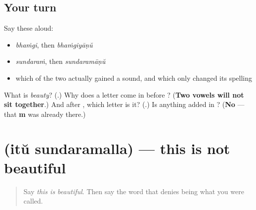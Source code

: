 \subsection*{Your turn}
Say these aloud:

\begin{itemize}
\raggedright
  \item \emph{bhaṁgi}, then \emph{bhaṁgiyāṇŭ}
  \item \emph{sundaraṁ}, then \emph{sundaramāṇŭ}
  \item which of the two actually gained a sound, and which only changed its spelling
\end{itemize}

\begin{tcolorbox}[breakable,colback=teal!4,colframe=teal!35!black,title={Before you move on}]
What is \emph{beauty}? (\textbf{}.) Why does a letter come in before \textbf{}? (\textbf{Two vowels will not sit together}.) And after \textbf{}, which letter is it? (\textbf{}.) Is anything added in \textbf{}? (\textbf{No} — that \textbf{m} was already there.)
\end{tcolorbox}
\section[\texorpdfstring{\ml{ഇത്} \ml{സുന്ദരമല്ല} (itŭ sundaramalla)}{ഇത് സുന്ദരമല്ല (itŭ sundaramalla)}]{  (itŭ sundaramalla) — this is not beautiful}

\label{lesson:ML-C97-alla-sundaram}



\begin{quote}
Say \emph{this is beautiful}. Then say the word that denies being what you were called.
\end{quote}

